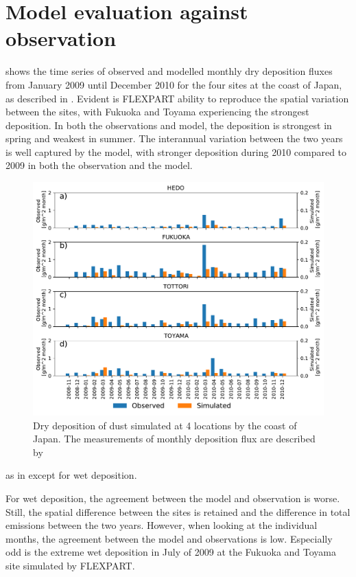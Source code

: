 \section{Model evaluation against observation}\label{sec:model_eval}

 shows the time series of observed and modelled monthly dry deposition fluxes from January 2009 until December 2010 for the four sites at the coast of Japan, as described in . 
Evident is FLEXPART ability to reproduce the spatial variation between the sites, with Fukuoka and Toyama experiencing the strongest deposition.
In both the observations and model, the deposition is strongest in spring and weakest in summer. 
The interannual variation between the two years is well captured by the model, with stronger deposition during 2010 compared to 2009 in both the observation and the model.
\begin{figure}[hptb]
    \centering
    \includegraphics[width=\textwidth]{texfiles/figs/monthly_accumulated_dry_depostion_japan.pdf}
    \caption{Dry deposition of dust simulated at 4 locations by the coast of Japan. The measurements of monthly deposition flux are described by \textcite{osada2014wet}}
    \label{fig:model_eval_dry_deposition}
\end{figure}
 as in  except for wet deposition.

For wet deposition, the agreement between the model and observation is worse.
Still, the spatial difference between the sites is retained and the difference in total emissions between the two years. 
However, when looking at the individual months,  the agreement between the model and observations is low. 
Especially odd is the extreme wet deposition in July of 2009 at the Fukuoka and Toyama site simulated by FLEXPART. 


